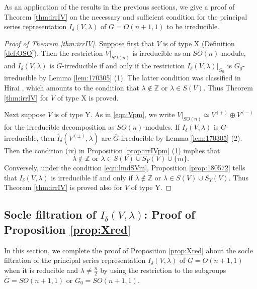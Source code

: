 As an application of the results in the previous sections, 
 we give a proof of Theorem \ref{thm:irrIV}
 on the necessary and sufficient condition
 for the principal series representation 
 $I_{\delta}(V,\lambda)$
 of $G=O(n+1,1)$ to be irreducible.  
\begin{proof}
[Proof of Theorem \ref{thm:irrIV}]
Suppose first that $V$ is of type X
 (Definition \ref{def:OSO}). 
Then the restriction $V|_{SO(n)}$ is irreducible as an $SO(n)$-module,
 and $I_{\delta}(V,\lambda)$ is $G$-irreducible
 if and only if the restriction $I_{\delta}(V,\lambda)|_{G_0}$ is 
 $G_0$-irreducible 
 by Lemma \ref{lem:170305} (1).  
The latter condition was classified in Hirai \cite{Hirai62}, 
 which amounts to the condition that $\lambda \not \in {\mathbb{Z}}$
 or $\lambda \in S(V)$.  
Thus Theorem \ref{thm:irrIV} for $V$ of type X is proved.  



Next suppose $V$ is of type Y.  
As in \eqref{eqn:Vpm}, 
 we write $V|_{SO(n)} \simeq V^{(+)} \oplus V^{(-)}$
 for the irreducible decomposition as $SO(n)$-modules.  
If $I_{\delta}(V,\lambda)$ is $G$-irreducible, 
then $\overline I_{\delta}(V^{(\pm)},\lambda)$ are $\overline G$-irreducible
 by Lemma \ref{lem:170305} (2).  
Then the condition (iv) in Proposition \ref{prop:irrIVpm} (1) implies
 that
\begin{equation}
\label{eqn:lmdSVm}
  \text{$\lambda \not \in {\mathbb{Z}}$ or $\lambda \in S(V) \cup S_Y(V) \cup \{m\}$}.  
\end{equation}
Conversely,
 under the condition \eqref{eqn:lmdSVm}, 
 Proposition \ref{prop:180572} tells
 that $I_{\delta}(V,\lambda)$ is irreducible
 if and only if $\lambda \not \in {\mathbb{Z}}$
or $\lambda \in S(V) \cup S_Y(V)$.  
Thus Theorem \ref{thm:irrIV} is proved
 also for $V$ of type Y.  
\end{proof}



\subsection{Socle filtration of $I_{\delta}(V,\lambda)$:
 Proof of Proposition \ref{prop:Xred}}
\label{subsec:Isub2}

In this section,
 we complete the proof of Proposition \ref{prop:Xred}
 about the socle filtration
 of the principal series representation $I_{\delta}(V,\lambda)$
 of $G=O(n+1,1)$
 when it is reducible and $\lambda \ne \frac n 2$
 by using the restriction to the subgroups 
 $\overline G=SO(n+1,1)$ or $G_0=SO(n+1,1)$.  


